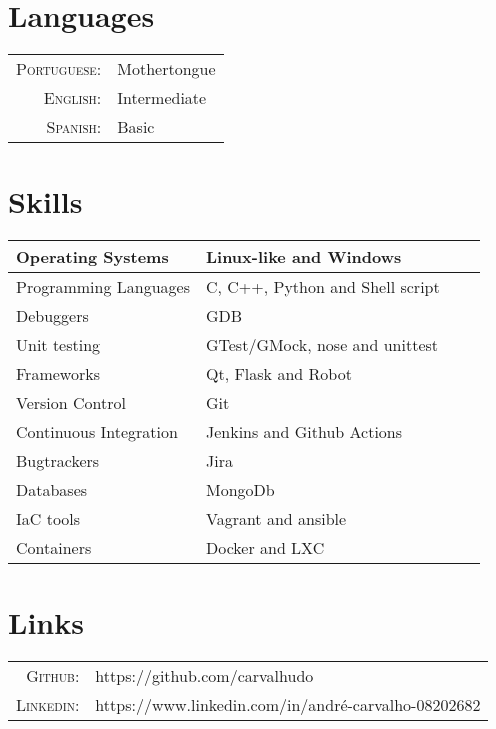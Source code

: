 \documentclass[a4paper,10pt]{article}
\begin{document}
\section{Languages}
\begin{tabular}{rl}
\textsc{Portuguese:}& Mothertongue\\
\textsc{English:}& Intermediate\\
\textsc{Spanish:}& Basic\\
\end{tabular}


\section{Skills}
\begin{center}
    \begin{tabular}{| l | l | l | l |}
    \hline
    Operating Systems & Linux-like and Windows\\ \hline
    Programming Languages & C, C++, Python and Shell script\\ \hline
    Debuggers & GDB \\ \hline
    Unit testing & GTest/GMock, nose and unittest\\ \hline
    Frameworks & Qt, Flask and Robot\\ \hline
    Version Control & Git\\ \hline
    Continuous Integration & Jenkins and Github Actions\\ \hline
    Bugtrackers & Jira\\ \hline
    Databases & MongoDb\\ \hline
    IaC tools & Vagrant and ansible\\ \hline
    Containers & Docker and LXC\\ \hline
    \end{tabular}
\end{center}

\section{Links}
\begin{tabular}{rl}
\textsc{Github:}& https://github.com/carvalhudo\\
\textsc{Linkedin:}&https://www.linkedin.com/in/andré-carvalho-08202682 \\
\end{tabular}
\end{document}
